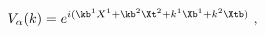 \begin{equation}
V_{\alpha}(k)=e^{i(\kb^1 X^1+\kb^2 \Xt^2+k^1 \Xb^1+k^2 \Xtb)} 
\ ,
\label{vertex;alpha}
\end{equation}

